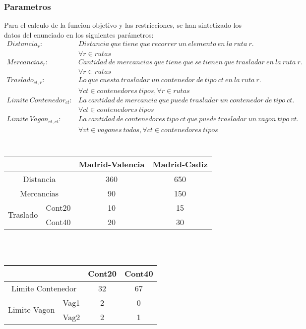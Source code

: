 \documentclass[11pt,spanish]{article}
\begin{document}
			\subsubsection{Parametros}
			Para el calculo de la funcion objetivo y las restricciones, se han sintetizado los datos del enunciado en los siguientes parámetros:
			\begin{align*}
				Distancia_r:& Distancia\ que\ tiene\ que\ recorrer\ un\ elemento\ en\ la\ ruta\ r.\\
				&\forall r \in rutas\\
				Mercancias_r:& Cantidad\ de\ mercancias\ que\ tiene\ que\ se\ tienen\ que\ trasladar\ en\ la\ ruta\ r.\\
				&\forall r \in rutas\\
				Traslado_{ct,r}:& Lo\ que\ cuesta\ trasladar\ un\ contenedor\ de\ tipo\ ct\ en\ la\ ruta\ r.\\
				&\forall ct \in contenedores\ tipos, \forall r \in rutas \\
				Limite\ Contenedor_{ct}:& La\ cantidad\ de\ mercancia\ que\ puede\ trasladar\ un\ contenedor\ de\ tipo\ ct.\\
				&\forall ct \in contenedores\ tipos\\
				Limite\ Vagon_{vt,ct}:& La\ cantidad\ de\ contenedores\ tipo\ ct\ que\ puede\ trasladar\ un\ vagon\ tipo\ vt.\\
				&\forall vt \in vagones\ todos, \forall ct \in contenedores\ tipos\\
			\end{align*}
			\\
			\begin{tabular}{ |c|c||c|c|  }
				\hline
				\multicolumn{2}{|c||}{}& Madrid-Valencia & Madrid-Cadiz \\
				\hline
				\multicolumn{2}{|c||}{Distancia} & 360 & 650\\
				\multicolumn{2}{|c||}{Mercancias} & 90 & 150\\
				\multirow{2}{*}{Traslado} & Cont20 & 10 & 15\\
				& Cont40 & 20 & 30\\
				\hline
			\end{tabular}
			\\
			\\
			\begin{tabular}{ |c|c||c|c|  }
				\hline
				\multicolumn{2}{|c||}{}& Cont20 & Cont40 \\
				\hline
				\multicolumn{2}{|c||}{Limite Contenedor} & 32 & 67\\
				\multirow{2}{*}{Limite Vagon} & Vag1 & 2 & 0\\
				& Vag2 & 2 & 1\\
				\hline
			\end{tabular}
\end{document}
